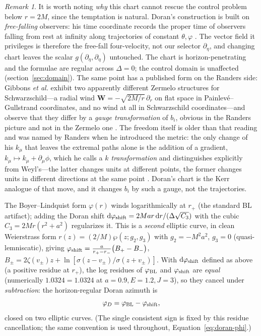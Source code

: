 \documentclass[12pt]{iopart}
\theoremstyle{plain}
\theoremstyle{definition}
\theoremstyle{remark}
\newtheorem{remark}[proposition]{Remark}
\newcommand{\rp}{r_{+}}
\newcommand{\dd}{\mathrm{d}}
\begin{document}
\begin{remark}
It is worth noting \emph{why} this chart cannot rescue the control problem below
$r=2M$, since the temptation is natural. Doran's construction is built on
\emph{free-falling} observers: his time coordinate records the proper time of
observers falling from rest at infinity along trajectories of constant
$\theta,\varphi$ \cite{Doran2000}. The vector field it privileges is therefore
the free-fall four-velocity, not our selector $\partial_\eta$, and changing chart
leaves the scalar $g(\partial_\eta,\partial_\eta)$ untouched. The chart is
horizon-penetrating and the formulae are regular across $\Delta=0$; the control
domain is unaffected (section~\ref{sec:domain}). The same point has a published
form on the Randers side: Gibbons \emph{et al.} exhibit two apparently different
Zermelo structures for Schwarzschild---a radial wind $\mathbf W=-\sqrt{2M/r}\,
\partial_r$ on flat space in Painlev\'e--Gullstrand coordinates, and no wind at all
in Schwarzschild coordinates---and observe that they differ by a \emph{gauge
transformation} of $b_i$, obvious in the Randers picture and not in the Zermelo one
\cite[Eqs.~(32)--(34)]{GibbonsRanders2009}. The freedom itself is older than that
reading and was named by Randers when he introduced the metric: the only change of
his $k_\mu$ that leaves the extremal paths alone is the addition of a gradient,
$k_\mu\mapsto k_\mu+\partial_\mu\phi$, which he calls a \emph{$k$ transformation}
and distinguishes explicitly from Weyl's---the latter changes units at different
points, the former changes units in different directions at the same point
\cite[Eqs.~(2)--(4)]{Randers1941}. Doran's chart is the Kerr analogue of that move,
and it changes $b_i$ by such a gauge, not the trajectories.
\end{remark}

The Boyer--Lindquist form
$\varphi(r)$ winds logarithmically at $\rp$ (the standard BL artifact); adding the
Doran shift $\dd\varphi_{\rm shift}=2Mar\,\dd r/(\Delta\sqrt{C_3})$ with the cubic
$C_3=2Mr(r^2+a^2)$ regularizes it. This is a \emph{second} elliptic curve, in
clean Weierstrass form $r(z)=(2/M)\wp(z;g_2,g_3)$ with $g_2=-M^2a^2$, $g_3=0$
(quasi-lemniscatic), giving
$\varphi_{\rm shift}=\tfrac{a}{r_+-r_-}\big(B_+-B_-\big)$,
$B_\pm=2\zeta(v_\pm)z+\ln[\sigma(z-v_\pm)/\sigma(z+v_\pm)]$. With
$\dd\varphi_{\rm shift}$ defined as above (a positive residue at $\rp$), the
log residues of $\varphi_{\rm BL}$ and $\varphi_{\rm shift}$ are \emph{equal}
(numerically $1.0324=1.0324$ at $a=0.9,E=1.2,J=3$), so they cancel under
\emph{subtraction}: the horizon-regular Doran azimuth is
\begin{equation}
    \varphi_D=\varphi_{\rm BL}-\varphi_{\rm shift},
    \label{eq:doran-phi}
\end{equation}
closed on two elliptic curves. (The single consistent sign is fixed by this
residue cancellation; the same convention is used throughout,
Equation~\eqref{eq:doran-phi}.)
\end{document}
